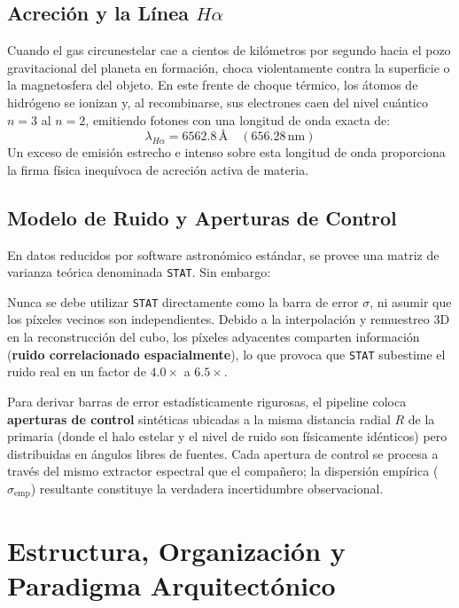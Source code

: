 \documentclass[11pt,a4paper]{article}
\begin{document}
\subsection{Acreción y la Línea \texorpdfstring{$H\alpha$}{H-alpha}}
Cuando el gas circunestelar cae a cientos de kilómetros por segundo hacia el pozo gravitacional del planeta en formación, choca violentamente contra la superficie o la magnetosfera del objeto. En este frente de choque térmico, los átomos de hidrógeno se ionizan y, al recombinarse, sus electrones caen del nivel cuántico $n=3$ al $n=2$, emitiendo fotones con una longitud de onda exacta de:
$$\lambda_{H\alpha} = 6562.8\,\text{\AA}\quad (656.28\,\text{nm})$$
Un exceso de emisión estrecho e intenso sobre esta longitud de onda proporciona la firma física inequívoca de acreción activa de materia.

\subsection{Modelo de Ruido y Aperturas de Control}
En datos reducidos por software astronómico estándar, se provee una matriz de varianza teórica denominada \texttt{STAT}. Sin embargo:
\begin{tcolorbox}[colframe=alertred, title=\textbf{Regla de Oro: El Problema de la Varianza Teórica (STAT)}]
Nunca se debe utilizar \texttt{STAT} directamente como la barra de error $\sigma$, ni asumir que los píxeles vecinos son independientes. Debido a la interpolación y remuestreo 3D en la reconstrucción del cubo, los píxeles adyacentes comparten información (\textbf{ruido correlacionado espacialmente}), lo que provoca que \texttt{STAT} subestime el ruido real en un factor de $\mathbf{4.0\times}$ a $\mathbf{6.5\times}$.
\end{tcolorbox}
Para derivar barras de error estadísticamente rigurosas, el pipeline coloca \textbf{aperturas de control} sintéticas ubicadas a la misma distancia radial $R$ de la primaria (donde el halo estelar y el nivel de ruido son físicamente idénticos) pero distribuidas en ángulos libres de fuentes. Cada apertura de control se procesa a través del mismo extractor espectral que el compañero; la dispersión empírica ($\sigma_\text{emp}$) resultante constituye la verdadera incertidumbre observacional.

\section{Estructura, Organización y Paradigma Arquitectónico}
\end{document}
